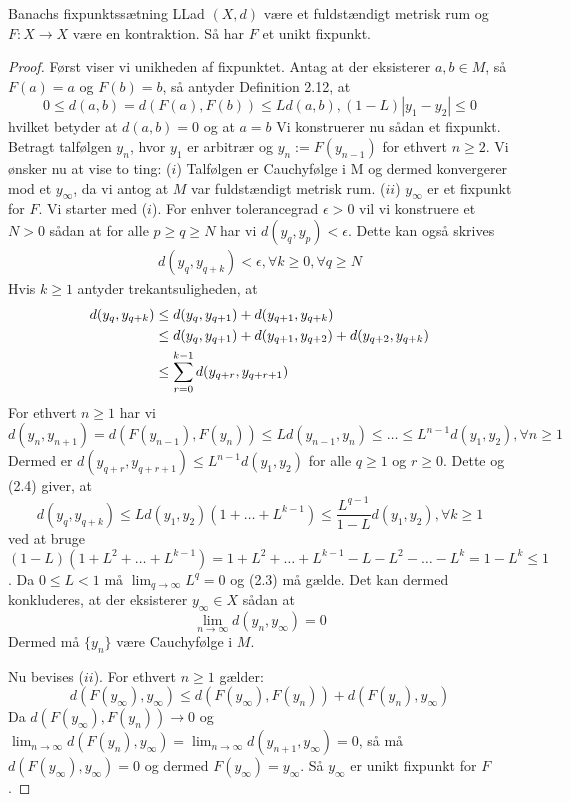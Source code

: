\begin{mytheo}{Banachs fixpunktssætning}
LLad $(X,d)$ være et fuldstændigt metrisk rum og $F:X\rightarrow X$ være en kontraktion. Så har $F$ et unikt fixpunkt.
\end{mytheo}

\begin{proof}
Først viser vi unikheden af fixpunktet. Antag at der eksisterer $a,b \in M$, så $F(a)=a$ og $F(b)=b$, så antyder Definition 2.12, at \hfill \break
$$0\leq d(a,b)=d(F(a),F(b))\leq Ld(a,b), (1-L)|y_1-y_2|\leq 0$$
hvilket betyder at $d(a,b)=0$ og at $a=b$ \hfill \break
\hfill \break
Vi konstruerer nu sådan et fixpunkt. Betragt talfølgen ${y_n}$, hvor $y_1$ er arbitrær og $y_n:=F(y_{n-1})$ for ethvert $n\geq 2$. Vi ønsker nu at vise to ting:\hfill \break
 ($i$) Talfølgen er Cauchyfølge i M og dermed konvergerer mod et $y_\infty$, da vi antog at $M$ var fuldstændigt metrisk rum.\hfill  \break
($ii$) $y_\infty$ er et fixpunkt for $F$. \hfill \break
Vi starter med ($i$). For enhver tolerancegrad $\epsilon > 0$ vil vi konstruere et $N > 0$ sådan at for alle $p\geq q \geq N$ har vi $d(y_q,y_p)<\epsilon$. Dette kan også skrives \hfill \break
\begin{align}
d(y_q,y_{q+k})<\epsilon,  \forall k \geq 0, \forall q \geq N
\end{align}
Hvis $k \geq 1$ antyder trekantsuligheden, at \hfill \break
\begin{align}
d(y_q,y_{q+k}) &\leq d(y_{q},y_{q+1})+d(y_{q+1},y_{q+k}) \notag\\
&\leq d(y_q,y_{q+1})+d(y_{q+1},y_{q+2})+d(y_{q+2},y_{q+k}) \notag\\
&\leq \sum\limits_{r=0}^{k-1} d(y_{q+r},y_{q+r+1})
\end{align}
For ethvert $n\geq 1$ har vi \hfill \break
$$d(y_n,y_{n+1})=d(F(y_{n-1}),F(y_n)) \leq Ld(y_{n-1},y_n) \leq \hdots \leq L^{n-1}d(y_1,y_2), \forall n \geq 1$$
Dermed er $d(y_{q+r},y_{q+r+1}) \leq L^{n-1}d(y_1,y_2)$ for alle $q \geq 1$ og $r\geq 0$. Dette og (2.4) giver, at \hfill \break
$$d(y_q,y_{q+k}) \leq L d(y_1,y_2)(1+\hdots+L^{k-1}) \leq \frac{L^{q-1}}{1-L}d(y_1,y_2), \forall k \geq 1$$
ved at bruge $(1-L)(1+L^2+\hdots+L^{k-1})=1+L^2+\hdots +L^{k-1}-L-L^2-\hdots -L^k= 1-L^k \leq 1$. \hfill \break
Da $0 \leq L < 1$ må $\lim_{q\rightarrow\infty} L^q=0$ og (2.3) må gælde. Det kan dermed konkluderes, at der eksisterer $y_\infty \in X$ sådan at \hfill \break
$$\lim_{n \to \infty} d(y_n,y_\infty)=0$$
Dermed må $\{y_n\}$ være Cauchyfølge i $M$. \hfill \break

Nu bevises ($ii$). For ethvert $n \geq 1$ gælder:
$$d(F(y_\infty),y_\infty)\leq d(F(y_\infty),F(y_n))+d(F(y_n),y_\infty)$$
Da $d(F(y_\infty),F(y_n))\rightarrow 0$ og $\lim_{n \to \infty} d(F(y_n),y_\infty) = \lim_{n \to \infty} d(y_{n+1},y_\infty)=0$, så må $d(F(y_\infty),y_\infty)=0$ og dermed $F(y_\infty)=y_\infty$. Så $y_\infty$ er unikt fixpunkt for $F$.
\end{proof}

